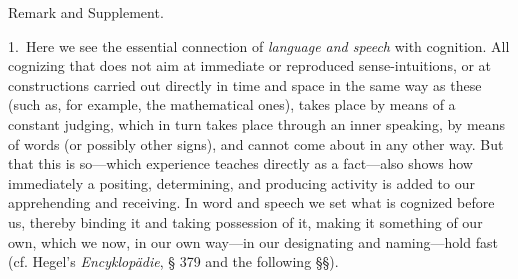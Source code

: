 \documentclass[12pt,a4paper]{book}
\begin{document}
\begin{center}Remark and Supplement.\end{center}
1.~Here we see the essential connection of \emph{language and speech} with
cognition. All cognizing that does not aim at immediate or reproduced
sense-intuitions, or at constructions carried out directly in time and space in
the same way as these (such as, for example, the mathematical ones), takes place
by means of a constant judging, which in turn takes place through an inner
speaking, by means of words (or possibly other signs), and cannot come about in
any other way. But that this is so---which experience teaches directly as a
fact---also shows how immediately a positing, determining, and producing
activity is added to our apprehending and receiving. In word and speech we set
what is cognized before us, thereby binding it and taking possession of it,
making it something of our own, which we now, in our own way---in our
designating and naming---hold fast (cf. Hegel's \textit{Encyklopädie}, § 379 and
the following §§).
\end{document}
